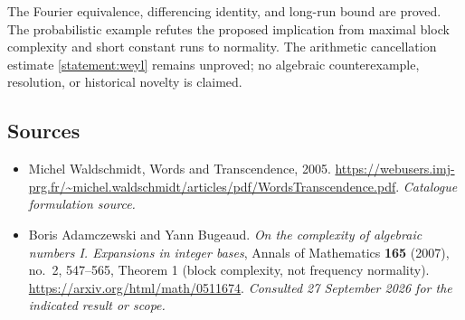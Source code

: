 \documentclass[11pt,a4paper]{article}
\numberwithin{equation}{section}
\begin{document}
The Fourier equivalence, differencing identity, and long-run bound are
proved.  The probabilistic example refutes the proposed implication
from maximal block complexity and short constant runs to normality.
The arithmetic cancellation estimate \eqref{statement:weyl} remains unproved;
no algebraic counterexample, resolution, or historical novelty is claimed.
\subsection{Sources}
\begin{itemize}\raggedright
\item[\textnormal{[S1]}]\hypertarget{source:statement:1}{} Michel Waldschmidt, Words and Transcendence, 2005.
\url{https://webusers.imj-prg.fr/~michel.waldschmidt/articles/pdf/WordsTranscendence.pdf}.
{\small\textit{Catalogue formulation source.}}
\item[\textnormal{[E1]}]\hypertarget{extra:statement:1}{} Boris Adamczewski and Yann Bugeaud.
\emph{On the complexity of algebraic numbers I. Expansions in integer bases}, Annals of Mathematics \textbf{165} (2007), no.~2, 547--565, Theorem 1 (block complexity, not frequency normality).
\url{https://arxiv.org/html/math/0511674}.
{\small\textit{Consulted 27 September 2026 for the indicated result or scope.}}
\end{itemize}
\end{document}
